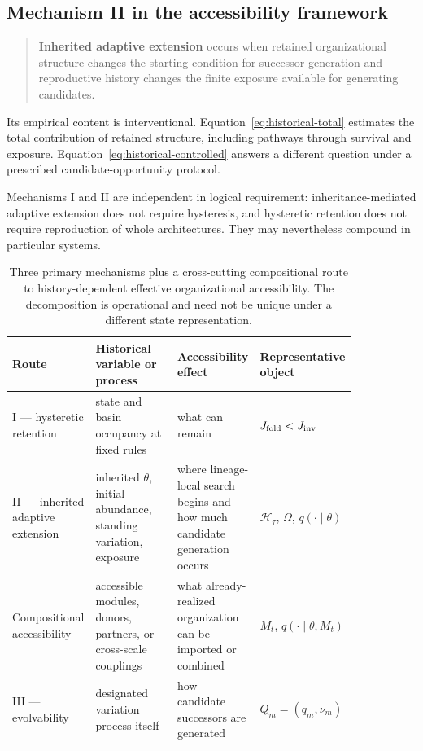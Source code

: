 \documentclass[11pt,a4paper]{article}
\begin{document}
\subsection{Mechanism II in the accessibility framework}

\begin{quote}
\textbf{Inherited adaptive extension} occurs when retained organizational structure changes the starting condition for successor generation and reproductive history changes the finite exposure available for generating candidates.
\end{quote}

Its empirical content is interventional. Equation~\eqref{eq:historical-total} estimates the total contribution of retained structure, including pathways through survival and exposure. Equation~\eqref{eq:historical-controlled} answers a different question under a prescribed candidate-opportunity protocol.

Mechanisms I and II are independent in logical requirement: inheritance-mediated adaptive extension does not require hysteresis, and hysteretic retention does not require reproduction of whole architectures. They may nevertheless compound in particular systems.

\begin{table}[htbp]
\centering
\small
\begin{tabular}{>{\raggedright\arraybackslash}p{0.17\linewidth}>{\raggedright\arraybackslash}p{0.25\linewidth}>{\raggedright\arraybackslash}p{0.24\linewidth}>{\raggedright\arraybackslash}p{0.18\linewidth}}
\toprule
Route & Historical variable or process & Accessibility effect & Representative object \\
\midrule
I --- hysteretic retention & state and basin occupancy at fixed rules & what can remain & $J_{\rm fold}<J_{\rm inv}$ \\
II --- inherited adaptive extension & inherited $\theta$, initial abundance, standing variation, exposure & where lineage-local search begins and how much candidate generation occurs & $\mathcal H_\tau$, $\Omega$, $q(\cdot\mid\theta)$ \\
Compositional accessibility & accessible modules, donors, partners, or cross-scale couplings & what already-realized organization can be imported or combined & $M_t$, $q(\cdot\mid\theta,M_t)$ \\
III --- evolvability & designated variation process itself & how candidate successors are generated & $Q_m=(q_m,\nu_m)$ \\
\bottomrule
\end{tabular}
\caption{Three primary mechanisms plus a cross-cutting compositional route to history-dependent effective organizational accessibility. The decomposition is operational and need not be unique under a different state representation.}
\label{tab:mechanisms}
\end{table}
\end{document}
